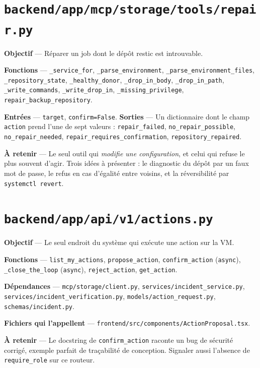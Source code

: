 \documentclass[11pt,a4paper]{report}
\newcommand{\file}[1]{\texttt{\small #1}}
\newcommand{\fn}[1]{\texttt{\small\textcolor{oasisviolet}{#1}}}
\begin{document}
\section{\file{backend/app/mcp/storage/tools/repair.py}}

\textbf{Objectif} --- Réparer un job dont le dépôt restic est introuvable.

\textbf{Fonctions} --- \fn{\_service\_for}, \fn{\_parse\_environment},
\fn{\_parse\_environment\_files}, \fn{\_repository\_state},
\fn{\_healthy\_donor}, \fn{\_drop\_in\_body}, \fn{\_drop\_in\_path},
\fn{\_write\_commands}, \fn{\_write\_drop\_in}, \fn{\_missing\_privilege},
\fn{repair\_backup\_repository}.

\textbf{Entrées} --- \texttt{target}, \texttt{confirm=False}.
\textbf{Sorties} --- Un dictionnaire dont le champ \texttt{action} prend l'une de
sept valeurs : \texttt{repair\_failed}, \texttt{no\_repair\_possible},
\texttt{no\_repair\_needed}, \texttt{repair\_requires\_confirmation},
\texttt{repository\_repaired}.

\textbf{À retenir} --- Le seul outil qui \emph{modifie une configuration}, et
celui qui refuse le plus souvent d'agir. Trois idées à présenter : le
diagnostic du dépôt par un faux mot de passe, le refus en cas d'égalité entre
voisins, et la réversibilité par \texttt{systemctl revert}.

\section{\file{backend/app/api/v1/actions.py}}

\textbf{Objectif} --- Le seul endroit du système qui exécute une action sur la
VM.

\textbf{Fonctions} --- \fn{list\_my\_actions}, \fn{propose\_action},
\fn{confirm\_action} (\texttt{async}), \fn{\_close\_the\_loop}
(\texttt{async}), \fn{reject\_action}, \fn{get\_action}.

\textbf{Dépendances} --- \file{mcp/storage/client.py},
\file{services/incident\_service.py}, \file{services/incident\_verification.py},
\file{models/action\_request.py}, \file{schemas/incident.py}.

\textbf{Fichiers qui l'appellent} --- \file{frontend/src/components/ActionProposal.tsx}.

\textbf{À retenir} --- Le docstring de \fn{confirm\_action} raconte un bug de
sécurité corrigé, exemple parfait de traçabilité de conception. Signaler aussi
l'absence de \fn{require\_role} sur ce routeur.
\end{document}
